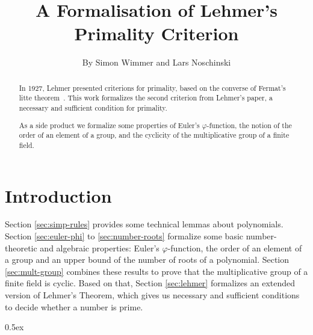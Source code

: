 \documentclass[11pt,a4paper]{article}
\begin{document}
\title{A Formalisation of Lehmer's Primality Criterion}
\author{By Simon Wimmer and Lars Noschinski}
\maketitle

\begin{abstract}
  In 1927, Lehmer presented criterions for primality, based on the
  converse of Fermat's litte theorem~\cite{lehmer1927fermat_converse}.
  This work formalizes the second criterion from Lehmer's paper,
  a necessary and sufficient condition for primality.

  As a side product we formalize some properties of Euler's $\varphi$-function,
  the notion of the order of an element of a group, and the cyclicity of the
  multiplicative group of a finite field.
\end{abstract}

\tableofcontents

\section{Introduction}

Section \ref{sec:simp-rules} provides some technical lemmas about polynomials.
Section \ref{sec:euler-phi} to \ref{sec:number-roots} formalize some basic number-theoretic
and algebraic properties: Euler's $\varphi$-function, the order of an element of a group
and an upper bound of the number of roots of a polynomial. Section \ref{sec:mult-group}
combines these results to prove that the multiplicative group of a finite field is cyclic.
Based on that, Section \ref{sec:lehmer} formalizes an extended version of Lehmer's Theorem,
which gives us necessary and sufficient conditions to decide whether a number is prime.

\parindent 0pt\parskip 0.5ex



\nocite{*}



\end{document}
